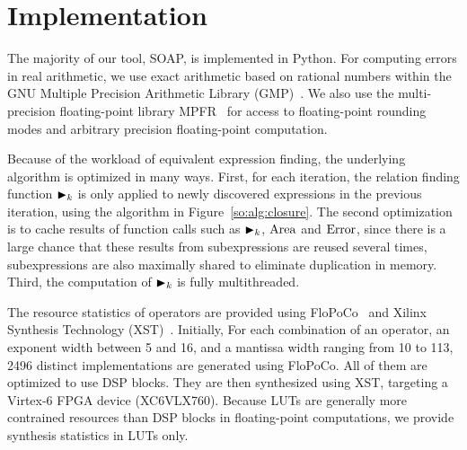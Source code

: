 \section{Implementation}
\label{so:sec:implementation}

The majority of our tool, SOAP, is implemented in Python. For computing
errors in real arithmetic, we use exact arithmetic based on rational numbers
within the GNU Multiple Precision Arithmetic Library (GMP)~\cite{gmp}. We
also use the multi-precision floating-point library MPFR~\cite{mpfr} for
access to floating-point rounding modes and arbitrary precision floating-point
computation.

Because of the workload of equivalent expression finding, the underlying
algorithm is optimized in many ways. First, for each iteration, the relation
finding function $\operatorname{\blacktriangleright}_k$ is only applied to newly discovered expressions in
the previous iteration, using the algorithm in Figure~\ref{so:alg:closure}. The
second optimization is to cache results of function calls such as $\operatorname{\blacktriangleright}_k$,
$\operatorname{\mathrm{Area}}$ and $\operatorname{\mathrm{Error}}$, since there is a large chance that these results
from subexpressions are reused several times, subexpressions are also
maximally shared to eliminate duplication in memory. Third, the computation of
$\operatorname{\blacktriangleright}_k$ is fully multithreaded.

The resource statistics of operators are provided using FloPoCo~\cite{flopoco}
and Xilinx Synthesis Technology (XST)~\cite{xst}. Initially, For each
combination of an operator, an exponent width between 5 and 16, and a mantissa
width ranging from 10 to 113, 2496 distinct implementations are generated
using FloPoCo. All of them are optimized to use DSP blocks. They are then
synthesized using XST, targeting a Virtex-6 FPGA device (XC6VLX760). Because
LUTs are generally more contrained resources than DSP blocks in floating-point
computations, we provide synthesis statistics in LUTs only.
